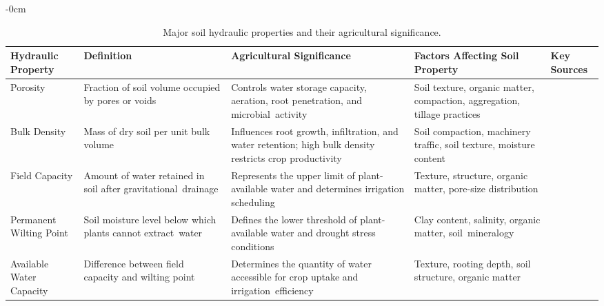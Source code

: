 \documentclass[land,review,accept,pdftex,oneauthor]{Definitions/mdpi}
\begin{document}
\begin{table}[H] 


\caption{Major soil hydraulic properties and their agricultural significance.}
\label{tab:soil_hydraulic_properties} 

\small
\renewcommand{\arraystretch}{1.2}

\begin{adjustwidth}{-\extralength}{0cm}
\begin{minipage}{\fulllength}
\begin{tabularx}{\textwidth}{m{2.6cm}<{\raggedright}m{4cm}<{\raggedright}m{4cm}<{\raggedright}m{4cm}<{\raggedright}m{2cm}<{\raggedright}}

\toprule
Hydraulic Property &
Definition &
Agricultural Significance &
Factors Affecting Soil Property &
Key Sources \\
\midrule


Porosity &
Fraction of soil volume occupied by pores or voids &
Controls water storage capacity, aeration, root penetration, and microbial~activity &
Soil texture, organic matter, compaction, aggregation, tillage practices &
\citep{Barik2020,DEOLIVEIRA2021104814,Rabot2018} \\ 
\midrule

Bulk Density &
Mass of dry soil per unit bulk volume &
Influences root growth, infiltration, and water retention; high bulk density restricts crop productivity &
Soil compaction, machinery traffic, soil texture, moisture content &
\citep{Assouline2011,Chaudhari2013,Keller2011} \\ 
\midrule

Field Capacity &
Amount of water retained in soil after gravitational~drainage &
Represents the upper limit of plant-available water and determines irrigation scheduling &
Texture, structure, organic matter, pore-size distribution &
\citep{Amsili2024,Twarakavi2009,Nachabe1998} \\ 
\midrule

Permanent Wilting Point &
Soil moisture level below which plants cannot extract~water &
Defines the lower threshold of plant-available water and drought stress conditions &
Clay content, salinity, organic matter, soil~mineralogy &
\citep{Gamagedara2025,Kirkham2014,Pidgeon1972} \\ 
\midrule

Available Water Capacity &
Difference between field capacity and wilting point &
Determines the quantity of water accessible for crop uptake and irrigation~efficiency &
Texture, rooting depth, soil structure, organic matter &
\citep{Amsili2024,ALTOBELLI20201765,Lal2020,Veihmeyer1927} \\
\midrule


\end{tabularx}
\end{minipage}
\end{adjustwidth}
\end{table}
\end{document}
